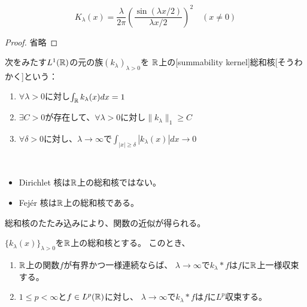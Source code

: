 \documentclass[report]{jlreq}
\begin{document}
\begin{proposition}
    \begin{equation}
        K_\lambda(x) = \frac{\lambda}{2\pi} \left(\frac{\sin(\lambda x / 2)}{\lambda x / 2}\right)^2
            \quad (x \neq 0)
    \end{equation}
\end{proposition}

\begin{proof}
    省略
\end{proof}

\begin{definition}[総和核]
    次をみたす$L^1(\mathbb{R})$の元の族$(k_\lambda)_{\lambda > 0}$を
    $\mathbb{R}$上の[summability kernel]{総和核}[そうわかく]という：
    \begin{enumerate}
        \item $\forall \lambda > 0$に対し$\int_{\mathbb{R}} k_\lambda(x) dx = 1$
        \item $\exists C > 0$が存在して、$\forall \lambda > 0$に対し$\|k_\lambda\|_1 \ge C$
        \item $\forall \delta > 0$に対し、$\lambda \to \infty$で$\int_{|x| \ge \delta} |k_\lambda(x)| dx \to 0$
    \end{enumerate}
\end{definition}

\begin{example}
    ~
    \begin{itemize}
        \item Dirichlet 核は$\mathbb{R}$上の総和核ではない。
        \item Fej\'{e}r 核は$\mathbb{R}$上の総和核である。
    \end{itemize}
\end{example}

総和核のたたみ込みにより、関数の近似が得られる。

\begin{theorem}
    $\{ k_\lambda(x) \}_{\lambda > 0}$を$\mathbb{R}$上の総和核とする。
    このとき、
    \begin{enumerate}
        \item $\mathbb{R}$上の関数$f$が有界かつ一様連続ならば、
            $\lambda \to \infty$で$k_\lambda * f$は$f$に$\mathbb{R}$上一様収束する。
        \item $1 \le p < \infty$と$f \in L^p(\mathbb{R})$に対し、
            $\lambda \to \infty$で$k_\lambda * f$は$f$に$L^p$収束する。
    \end{enumerate}
\end{theorem}
\end{document}
